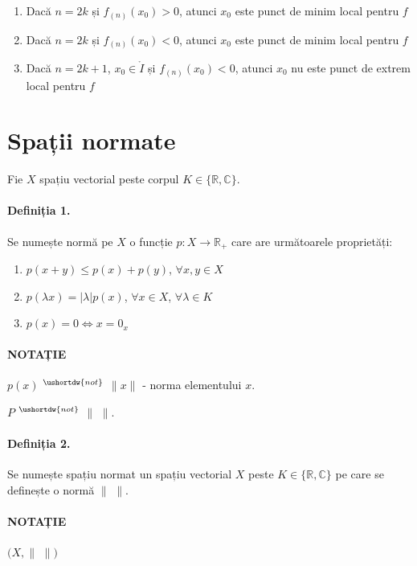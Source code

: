 \begin{enumerate}[label=\emph{\alph*})]
	\item Dacă $n = 2k$ și $f_{(n)}(x_{0}) > 0$, atunci $x_{0}$ este punct de minim local pentru $f$
	\item Dacă $n = 2k$ și $f_{(n)}(x_{0}) < 0$, atunci $x_{0}$ este punct de minim local pentru $f$
	\item Dacă $n = 2k+1$, $x_{0} \in \mathring{I}$ și $f_{(n)}(x_{0}) < 0$, atunci $x_{0}$ nu este punct de extrem local pentru $f$
\end{enumerate}

\section{Spații normate}
Fie $X$ spațiu vectorial peste corpul $K \in \{ \mathbb{R}, \mathbb{C} \}$.

\paragraph{Definiția 1.}
Se numește normă pe $X$ o funcție $p:X \rightarrow \mathbb{R}_{+}$ care are următoarele proprietăți:
\begin{enumerate}[label=\emph{\alph*})]
	\item $p(x+y) \leq p(x) + p(y)$, $\forall x, y \in X$
	\item $p(\lambda x) = \lvert \lambda \rvert p(x)$, $\forall x \in X$, $\forall \lambda \in K$
	\item $p(x) = 0 \Leftrightarrow x = 0_{x}$
\end{enumerate}

\paragraph{NOTAȚIE}

$p(x)$ $^{\ushortdw{not}}$ $\lVert x \rVert$ - norma elementului $x$.

\hspace{56pt} $P$ $^{\ushortdw{not}}$ $\lVert$ $\rVert$.

\paragraph{Definiția 2.}
Se numește spațiu normat un spațiu vectorial $X$ peste $K \in \{ \mathbb{R}, \mathbb{C} \}$ pe care se definește o normă $\lVert$ $\rVert$.

\paragraph{NOTAȚIE}
$(X, \lVert$ $\rVert)$

